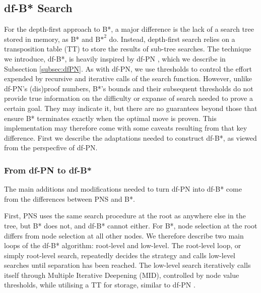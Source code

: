 \subsection{df-B* Search}
\label{subsec:dfBstar:description}
For the depth-first approach to B*, a major difference is the lack of a search tree stored in memory, as B* and ${\text{B*}}^2$ do. Instead, depth-first search relies on a transposition table (TT) to store the results of sub-tree searches. The technique we introduce, df-B*, is heavily inspired by df-PN \cite{Nagai2002}, which we describe in Subsection \ref{subsec:dfPN}.
As with df-PN, we use thresholds to control the effort expended by recursive and iterative calls of the search function. However, unlike df-PN's (dis)proof numbers, B*'s bounds and their subsequent thresholds do not provide true information on the difficulty or expanse of search needed to prove a certain goal. They may indicate it, but there are no guarantees beyond those that ensure B* terminates exactly when the optimal move is proven. This implementation may therefore come with some caveats resulting from that key difference. First we describe the adaptations needed to construct df-B*, as viewed from the perspecfive of df-PN.

\subsubsection{From df-PN to df-B*}
The main additions and modifications needed to turn df-PN into df-B* come from the differences between PNS and B*.

First, PNS uses the same search procedure at the root as anywhere else in the tree, but B* does not, and df-B* cannot either. For B*, node selection at the root differs from node selection at all other nodes.
We therefore describe two main loops of the df-B* algorithm: root-level and low-level. The root-level loop, or simply root-level search, repeatedly decides the strategy and calls low-level searches until separation has been reached. The low-level search iteratively calls itself through Multiple Iterative Deepening (MID), controlled by node value thresholds, while utilising a TT for storage, similar to df-PN \cite{Nagai2002}.

